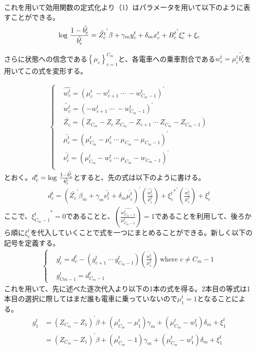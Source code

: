 \documentclass{jsarticle}
\begin{document}
これを用いて効用関数の定式化より（1）はパラメータを用いて以下のように表すことができる。
\begin{align}
	{\rm log}\ \frac{1 - \tilde{{b_c^t}}}{\tilde{b_c^t}} = \tilde{Z_c^t}^{'} \beta + \gamma_m y_c^t + \delta_m x_c^t + {B_c^t}^{'} \xi_c^{*} + \xi_c
\end{align}

さらに状態への信念である$\left\{ \mu_c \right\}_{c = 1}^{C_m}$と、各電車への乗車割合である$w_c^t = \mu_c^t \tilde{b_c^t}$を用いてこの式を変形する。

\begin{align*}
	\begin{cases}
	&\hat{w_c^t} = \left( \mu_c^t\  -w_{c+1}^t\  \cdots\  -w_{C_m-1}^t\right)^{'}\\[8pt]
	&\tilde{w_c^t} =  \left( -w_{c+1}^t\  \cdots\  -w_{C_m-1}^t\right)^{'}\\[8pt]
	&\bar{Z_c} = \left(Z_{C_m} - Z_c\ Z_{C_m} - Z_{c+1}\ \cdots\ Z_{C_m} - Z_{C_m - 1}\right)\\[8pt]
	&\bar{\mu_c^t} = \left( \mu_{C_m}^t - \mu_c^t\ \cdots\ \mu_{C_m} - \mu_{C_m-1} \right)^{'}\\[8pt]
	&\bar{\nu_c^t} = \left( \mu_{C_m}^t - w_c^t\ \cdots\ \mu_{C_m} - w_{C_m-1} \right)^{'}\\[8pt]
	\end{cases}
\end{align*}
とおく。$d_c^t = {\rm log}\ \frac{1 - \tilde{{b_c^t}}}{\tilde{b_c^t}}$とすると、先の式は以下のように書ける。
\begin{align*}
	d_c^t = \left( \bar{Z_c}^{'}\beta_m + \gamma_m \bar{\nu_c^t} + \delta_m \bar{\mu_c^t} \right)^{'} \left( \frac{\hat{w_c^t}}{\mu_c^t} \right) + {{\xi_c^t}^{*}}^{'} \left( \frac{\tilde{w_c^t}}{\mu_c^t} \right) + \xi_c^t
\end{align*}
ここで、${\xi_{C_m-1}^t}^{*} = 0$であることと、$\left( \frac{\hat{w_{C_m-1}^t}}{\mu_{C_m-1}^t} \right) = 1$であることを利用して、後ろから順に$\xi_c^t$を代入していくことで式を一つにまとめることができる。新しく以下の記号を定義する。
\begin{align*}
\begin{cases}
	&g_c^t = d_c^t - \left( g_{c+1}^t\ \cdots\ g_{C_m-1}^t\right) \left( \frac{\tilde{w_c^t}}{\mu_c^t} \right)\ \text{where $c \neq C_m -1$}\\[8pt]
	&g_{Cm-1}^t = d_{C_m-1}^t
\end{cases}
\end{align*}
これを用いて、先に述べた逐次代入より以下の1本の式を得る。2本目の等式は1本目の選択に際してはまだ誰も電車に乗っていないので$\mu_1^t = 1$となることによる。
\begin{align*}
	g_1^t &= (Z_{C_m} - Z_1)^{'} \beta + (\mu_{C_m}^t - \mu_1^t)\gamma_m + (\mu_{C_m}^t - w_1^t)\delta_m + \xi_1^t\\[8pt]
	&= (Z_{C_m} - Z_1)^{'} \beta + \left(\mu_{C_m}^t-1\right)\gamma_m + (\mu_{C_m}^t - w_1^t)\delta_m + \xi_1^t
\end{align*}
\end{document}
